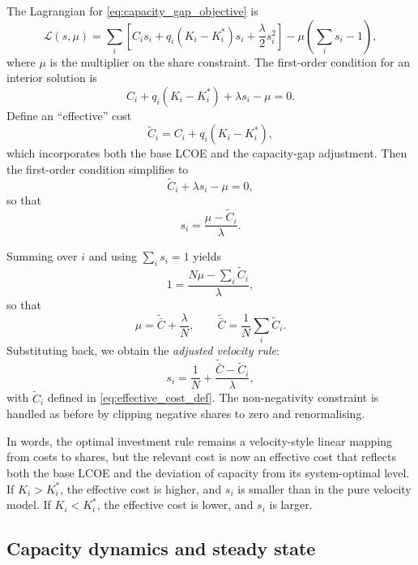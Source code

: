 \documentclass[preprint,authoryear,12pt]{elsarticle}
\begin{document}
The Lagrangian for \eqref{eq:capacity_gap_objective} is
\begin{equation}
    \mathcal{L}(s,\mu)
    = \sum_i \left[
        C_i s_i + q_i (K_i - K_i^*) s_i + \frac{\lambda}{2} s_i^2
      \right]
      - \mu \left( \sum_i s_i - 1 \right),
\end{equation}
where $\mu$ is the multiplier on the share constraint. The first-order condition for an interior
solution is
\begin{equation}
    C_i + q_i (K_i - K_i^*)
    + \lambda s_i
    - \mu = 0.
\end{equation}
Define an “effective” cost
\begin{equation}
    \tilde{C}_i
    = C_i + q_i (K_i - K_i^*),
    \label{eq:effective_cost_def}
\end{equation}
which incorporates both the base LCOE and the capacity-gap adjustment. Then the
first-order condition simplifies to
\begin{equation}
    \tilde{C}_i + \lambda s_i - \mu = 0,
\end{equation}
so that
\begin{equation}
    s_i = \frac{\mu - \tilde{C}_i}{\lambda}.
\end{equation}

Summing over $i$ and using $\sum_i s_i = 1$ yields
\[
    1 = \frac{N\mu - \sum_i \tilde{C}_i}{\lambda},
\]
so that
\[
    \mu = \tilde{\bar{C}} + \frac{\lambda}{N},
    \qquad
    \tilde{\bar{C}} = \frac{1}{N}\sum_i \tilde{C}_i.
\]
Substituting back, we obtain the \emph{adjusted velocity rule}:
\begin{equation}
    s_i
    = \frac{1}{N}
      + \frac{\tilde{\bar{C}} - \tilde{C}_i}{\lambda},
    \label{eq:adjusted_velocity_rule}
\end{equation}
with $\tilde{C}_i$ defined in \eqref{eq:effective_cost_def}. The non-negativity constraint is
handled as before by clipping negative shares to zero and renormalising.

In words, the optimal investment rule remains a velocity-style linear mapping from costs to
shares, but the relevant cost is now an effective cost that reflects both the base LCOE and the
deviation of capacity from its system-optimal level. If $K_i > K_i^*$, the effective cost is higher,
and $s_i$ is smaller than in the pure velocity model. If $K_i < K_i^*$, the effective cost is lower,
and $s_i$ is larger.

\subsection*{Capacity dynamics and steady state}
\end{document}
